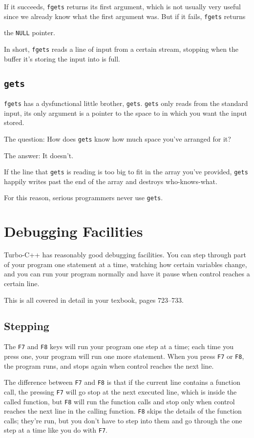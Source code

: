 If it succeeds, {\tt fgets} returns its first argument, which is not
usually very useful since we already know what the first argument was.
But if it fails, {\tt fgets} returns {the {\tt NULL} pointer.

In short, {\tt fgets} reads a line of input from a certain stream,
stopping when the buffer it's storing the input into is full.

\subsection{{\tt gets}}

{\tt fgets} has a dysfunctional little brother, {\tt gets}.  {\tt gets}
only reads from the standard input, its only argument is a pointer to
the space to in which you want the input stored.  

The question:  How does {\tt gets} know how much space you've arranged
for it?

The answer:  It doesn't.

If the line that {\tt gets} is reading is too big to fit in the array
you've provided, {\tt gets} happily writes past the end of the array and
destroys who-knows-what.

For this reason, serious programmers never use {\tt gets}.

\section{Debugging Facilities}

Turbo-C++ has reasonably good debugging facilities.  You can step
through part of your program one statement at a time, watching how
certain variables change, and you can run your program normally and have
it pause when control reaches a certain line.

This is all covered in detail in your texbook, pages 723--733.

\subsection{Stepping}

The {\tt F7} and {\tt F8} keys will run your program one step at a time;
each time you press one, your program will run one more statement.  When
you press {\tt F7} or {\tt F8}, the program runs, and stops again when
control reaches the next line. 

The difference between {\tt F7} and {\tt F8} is that if the current line
contains a function call, the pressing {\tt F7} will go stop at the next
executed line, which is inside the called function, but {\tt F8} will
run the function calls and stop only when control reaches the next line
in the calling function.  {\tt F8} skips the details of the function
calls; they're run, but you don't have to step into them and go through
the one step at a time like you do with {\tt F7}.

}
